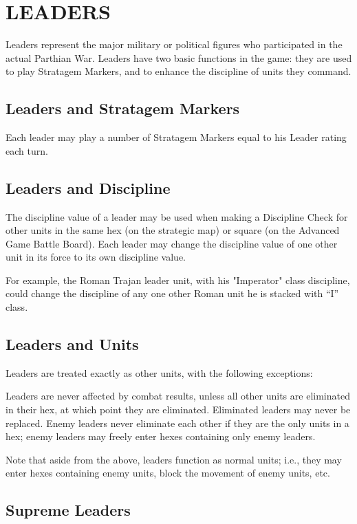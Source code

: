 \section{LEADERS}

Leaders represent the major military or political figures who participated in the actual Parthian War. Leaders have two basic functions in the game: they are used to play Stratagem Markers, and to enhance the discipline of units they command.

\subsection{Leaders and Stratagem Markers}

Each leader may play a number of Stratagem Markers equal to his Leader rating each turn.

\subsection{Leaders and Discipline}

The discipline value of a leader may be used when making a Discipline Check for other units in the same hex (on the strategic map) or square (on the Advanced Game Battle Board). Each leader may change the discipline value of one other unit in its force to its own discipline value.

For example, the Roman Trajan leader unit, with his "Imperator" class discipline, could change the discipline of any one other Roman unit he is stacked with “I” class.

\subsection{Leaders and Units}

Leaders are treated exactly as other units, with the following exceptions:

Leaders are never affected by combat results, unless all other units are eliminated in their hex, at which point they are eliminated.
Eliminated leaders may never be replaced. Enemy leaders never eliminate each other if they are the only units in a hex; enemy leaders may freely enter hexes containing only enemy leaders.

Note that aside from the above, leaders function as normal units; i.e., they may enter hexes containing enemy units, block the movement of enemy units, etc.

\subsection{Supreme Leaders}

